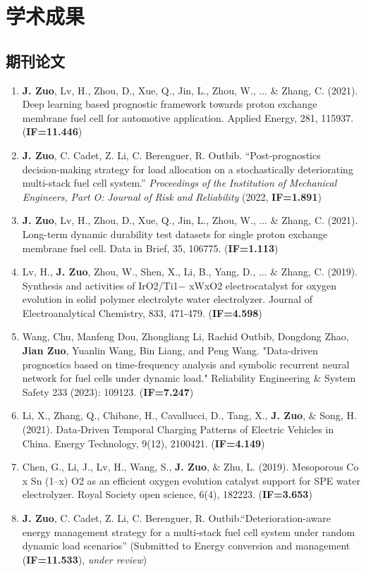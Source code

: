 \documentclass{resume}
\begin{document}
\section{学术成果}
\subsection{\textbf{期刊论文}}
\begin{enumerate}[parsep=0.2ex]
  \item \textbf{J. Zuo}, Lv, H., Zhou, D., Xue, Q., Jin, L., Zhou, W., ... $\&$ Zhang, C. (2021). Deep learning based prognostic framework towards proton exchange membrane fuel cell for automotive application. Applied Energy, 281, 115937.  (\textbf{IF=11.446})
  \item \textbf{J. Zuo}, C. Cadet, Z. Li, C. Berenguer, R. Outbib. ``Post-prognostics decision-making strategy for load allocation on a stochastically deteriorating multi-stack fuel cell system.'' \textit{Proceedings} \textit{of} \textit{the} \textit{Institution} \textit{of} \textit{Mechanical} \textit{Engineers,} \textit{Part} \textit{O:} \textit{Journal} \textit{of} \textit{Risk} \textit{and} \textit{Reliability} (2022, \textbf{IF=1.891})
  \item \textbf{J. Zuo}, Lv, H., Zhou, D., Xue, Q., Jin, L., Zhou, W., ... $\&$ Zhang, C. (2021). Long-term dynamic durability test datasets for single proton exchange membrane fuel cell. Data in Brief, 35, 106775. (\textbf{IF=1.113})
  \item Lv, H., \textbf{J. Zuo}, Zhou, W., Shen, X., Li, B., Yang, D., ... $\&$ Zhang, C. (2019). Synthesis and activities of IrO2/Ti1− xWxO2 electrocatalyst for oxygen evolution in solid polymer electrolyte water electrolyzer. Journal of Electroanalytical Chemistry, 833, 471-479. (\textbf{IF=4.598})
  \item Wang, Chu, Manfeng Dou, Zhongliang Li, Rachid Outbib, Dongdong Zhao, \textbf{Jian Zuo}, Yuanlin Wang, Bin Liang, and Peng Wang. "Data-driven prognostics based on time-frequency analysis and symbolic recurrent neural network for fuel cells under dynamic load." Reliability Engineering \& System Safety 233 (2023): 109123. (\textbf{IF=7.247})
  \item Li, X., Zhang, Q., Chibane, H., Cavallucci, D., Tang, X., \textbf{J. Zuo}, $\&$ Song, H. (2021). Data‐Driven Temporal Charging Patterns of Electric Vehicles in China. Energy Technology, 9(12), 2100421. (\textbf{IF=4.149})
  \item Chen, G., Li, J., Lv, H., Wang, S., \textbf{J. Zuo}, $\&$ Zhu, L. (2019). Mesoporous Co x Sn (1–x) O2 as an efficient oxygen evolution catalyst support for SPE water electrolyzer. Royal Society open science, 6(4), 182223. (\textbf{IF=3.653})
  \item \textbf{J. Zuo}, C. Cadet, Z. Li, C. Berenguer, R. Outbib.“Deterioration-aware energy management strategy for a multi-stack fuel cell system under random dynamic load scenarios” (Submitted to Energy conversion and management (\textbf{IF=11.533}), \textit{under review})
\end{enumerate}
\end{document}
